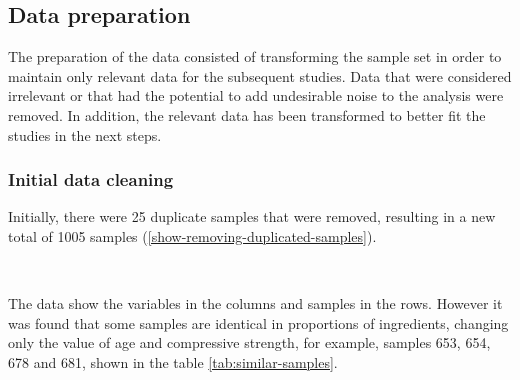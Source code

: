 \documentclass[
]{article}
\begin{document}
\hypertarget{data-preparation}{%
\subsection{Data preparation}\label{data-preparation}}

The preparation of the data consisted of transforming the sample set in
order to maintain only relevant data for the subsequent studies. Data
that were considered irrelevant or that had the potential to add
undesirable noise to the analysis were removed. In addition, the
relevant data has been transformed to better fit the studies in the next
steps.

\hypertarget{initial-data-cleaning}{%
\subsubsection{Initial data cleaning}\label{initial-data-cleaning}}

Initially, there were 25 duplicate samples that were removed, resulting
in a new total of 1005 samples (\ref{show-removing-duplicated-samples}).

~

The data show the variables in the columns and samples in the rows.
However it was found that some samples are identical in proportions of
ingredients, changing only the value of age and compressive strength,
for example, samples 653, 654, 678 and 681, shown in the table
\ref{tab:similar-samples}.

~

\begin{table}[H]

\caption{\label{tab:similar-samples}Samples with same composition}
\centering
{}
\end{table}
\end{document}

